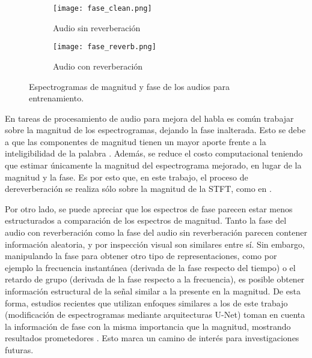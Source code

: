 \begin{figure}[H]
\centering
\begin{subfigure}{.5\textwidth}
  \centering
  \texttt{[image: fase\_clean.png]}
  \caption{Audio sin reverberación}
  \label{fig:fase_sub1}
\end{subfigure}%
\begin{subfigure}{.5\textwidth}
  \centering
  \texttt{[image: fase\_reverb.png]}
  \caption{Audio con reverberación}
  \label{fig:fase_sub2}
\end{subfigure}
\caption{Espectrogramas de magnitud y fase de los audios para entrenamiento.}
\label{fig:fases}
\end{figure} 

En tareas de procesamiento de audio para mejora del habla es común trabajar sobre la magnitud de los espectrogramas, dejando la fase inalterada. Esto se debe a que las componentes de magnitud tienen un mayor aporte frente a la inteligibilidad de la palabra \cite{phase_book, unphase}. Además, se reduce el costo computacional teniendo que estimar únicamente la magnitud del espectrograma mejorado, en lugar de la magnitud y la fase.  Es por esto que, en este trabajo, el proceso de dereverberación se realiza sólo sobre la magnitud de la STFT, como en \cite{CNN, FCN, skip, rir_filtinverso}. 

Por otro lado, se puede apreciar que los espectros de fase parecen estar menos estructurados a comparación de los espectros de magnitud. Tanto la fase del audio con reverberación como la fase del audio sin reverberación parecen contener información aleatoria, y por inspección visual son similares entre sí. Sin embargo, manipulando la fase para obtener otro tipo de representaciones, como por ejemplo la frecuencia instantánea (derivada de la fase respecto del tiempo) o el retardo de grupo (derivada de la fase respecto a la frecuencia), es posible obtener información estructural de la señal similar a la presente en la magnitud. De esta forma, estudios recientes que utilizan enfoques similares a los de este trabajo (modificación de espectrogramas mediante arquitecturas U-Net) toman en cuenta la información de fase con la misma importancia que la magnitud, mostrando resultados prometedores \cite{phaseaware}. Esto marca un camino de interés para investigaciones futuras. 

